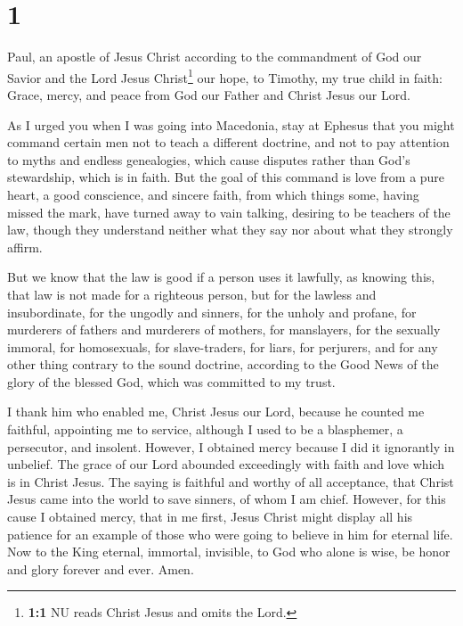 \hypertarget{section}{%
\section{1}\label{section}}

 Paul, an apostle of Jesus Christ according to the
commandment of God our Savior and the Lord Jesus Christ\footnote{\textbf{1:1}
  NU reads Christ Jesus and omits the Lord.} our hope,  to
Timothy, my true child in faith: Grace, mercy, and peace from God our
Father and Christ Jesus our Lord.

 As I urged you when I was going into Macedonia, stay at
Ephesus that you might command certain men not to teach a different
doctrine,  and not to pay attention to myths and endless
genealogies, which cause disputes rather than God's stewardship, which
is in faith.  But the goal of this command is love from a
pure heart, a good conscience, and sincere faith,  from
which things some, having missed the mark, have turned away to vain
talking,  desiring to be teachers of the law, though they
understand neither what they say nor about what they strongly affirm.

 But we know that the law is good if a person uses it
lawfully,  as knowing this, that law is not made for a
righteous person, but for the lawless and insubordinate, for the ungodly
and sinners, for the unholy and profane, for murderers of fathers and
murderers of mothers, for manslayers,  for the sexually
immoral, for homosexuals, for slave-traders, for liars, for perjurers,
and for any other thing contrary to the sound doctrine, 
according to the Good News of the glory of the blessed God, which was
committed to my trust.

 I thank him who enabled me, Christ Jesus our Lord,
because he counted me faithful, appointing me to service,
 although I used to be a blasphemer, a persecutor, and
insolent. However, I obtained mercy because I did it ignorantly in
unbelief.  The grace of our Lord abounded exceedingly
with faith and love which is in Christ Jesus.  The saying
is faithful and worthy of all acceptance, that Christ Jesus came into
the world to save sinners, of whom I am chief.  However,
for this cause I obtained mercy, that in me first, Jesus Christ might
display all his patience for an example of those who were going to
believe in him for eternal life.  Now to the King
eternal, immortal, invisible, to God who alone is wise, be honor and
glory forever and ever. Amen.

